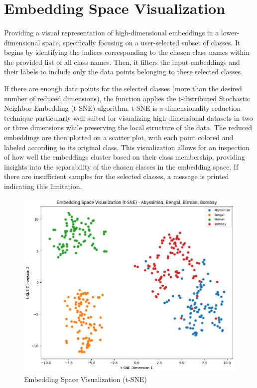 \documentclass{CUP-JNL-DTM}
\theoremstyle{definition}
\numberwithin{equation}{section}
\begin{document}
\section{Embedding Space Visualization}

\paragraph{}Providing a visual representation of high-dimensional embeddings in a lower-dimensional space, specifically focusing on a user-selected subset of classes. It begins by identifying the indices corresponding to the chosen class names within the provided list of all class names. Then, it filters the input embeddings and their labels to include only the data points belonging to these selected classes.

If there are enough data points for the selected classes (more than the desired number of reduced dimensions), the function applies the t-distributed Stochastic Neighbor Embedding (t-SNE) algorithm. t-SNE is a dimensionality reduction technique particularly well-suited for visualizing high-dimensional datasets in two or three dimensions while preserving the local structure of the data. The reduced embeddings are then plotted on a scatter plot, with each point colored and labeled according to its original class. This visualization allows for an inspection of how well the embeddings cluster based on their class membership, providing insights into the separability of the chosen classes in the embedding space. If there are insufficient samples for the selected classes, a message is printed indicating this limitation.

\begin{figure}[ht]
    \centering
    \includegraphics[width=0.75\linewidth]{scatter22.png}
    \caption{Embedding Space Visualization (t-SNE)}
    \label{fig:enter-label}
\end{figure}
\end{document}
